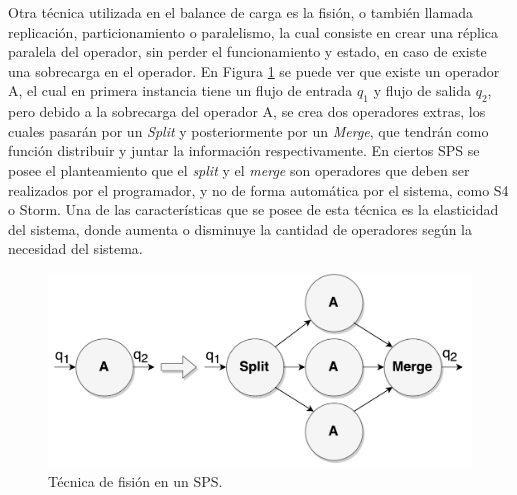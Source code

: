 Otra técnica utilizada en el balance de carga es la fisión, o también llamada replicación, particionamiento o paralelismo, la cual consiste en crear una réplica paralela del operador, sin perder el funcionamiento y estado, en caso de existe una sobrecarga en el operador. En Figura \ref{fig:fision} se puede ver que existe un operador A, el cual en primera instancia tiene un flujo de entrada $q_1$ y flujo de salida $q_2$, pero debido a la sobrecarga del operador A, se crea dos operadores extras, los cuales pasarán por un \textit{Split} y posteriormente por un \textit{Merge}, que tendrán como función distribuir y juntar la información respectivamente. En ciertos SPS se posee el planteamiento que el \textit{split} y el \textit{merge} son operadores que deben ser realizados por el programador, y no de forma automática por el sistema, como S4 o Storm. Una de las características que se posee de esta técnica es la elasticidad del sistema, donde aumenta o disminuye la cantidad de operadores según la necesidad del sistema.

\begin{figure}[!ht]
	\centering
	\includegraphics[scale=0.4]{images/Fision.pdf}
	\caption{Técnica de fisión en un SPS.}
	\label{fig:fision}
\end{figure}



